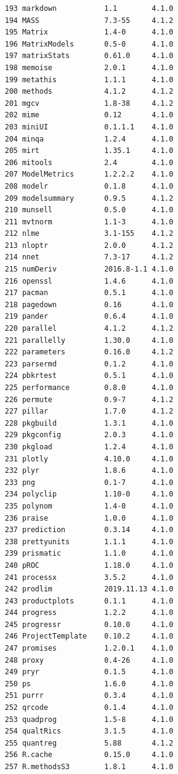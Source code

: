 \documentclass[
  a4paper,
  pandoc,
  ja=standard,
  jafont=haranoaji]{bxjsbook}
\begin{document}
\begin{verbatim}
193 markdown           1.1        4.1.0
194 MASS               7.3-55     4.1.2
195 Matrix             1.4-0      4.1.0
196 MatrixModels       0.5-0      4.1.0
197 matrixStats        0.61.0     4.1.0
198 memoise            2.0.1      4.1.0
199 metathis           1.1.1      4.1.0
200 methods            4.1.2      4.1.2
201 mgcv               1.8-38     4.1.2
202 mime               0.12       4.1.0
203 miniUI             0.1.1.1    4.1.0
204 minqa              1.2.4      4.1.0
205 mirt               1.35.1     4.1.0
206 mitools            2.4        4.1.0
207 ModelMetrics       1.2.2.2    4.1.0
208 modelr             0.1.8      4.1.0
209 modelsummary       0.9.5      4.1.2
210 munsell            0.5.0      4.1.0
211 mvtnorm            1.1-3      4.1.0
212 nlme               3.1-155    4.1.2
213 nloptr             2.0.0      4.1.2
214 nnet               7.3-17     4.1.2
215 numDeriv           2016.8-1.1 4.1.0
216 openssl            1.4.6      4.1.0
217 pacman             0.5.1      4.1.0
218 pagedown           0.16       4.1.0
219 pander             0.6.4      4.1.0
220 parallel           4.1.2      4.1.2
221 parallelly         1.30.0     4.1.0
222 parameters         0.16.0     4.1.2
223 parsermd           0.1.2      4.1.0
224 pbkrtest           0.5.1      4.1.0
225 performance        0.8.0      4.1.0
226 permute            0.9-7      4.1.2
227 pillar             1.7.0      4.1.2
228 pkgbuild           1.3.1      4.1.0
229 pkgconfig          2.0.3      4.1.0
230 pkgload            1.2.4      4.1.0
231 plotly             4.10.0     4.1.0
232 plyr               1.8.6      4.1.0
233 png                0.1-7      4.1.0
234 polyclip           1.10-0     4.1.0
235 polynom            1.4-0      4.1.0
236 praise             1.0.0      4.1.0
237 prediction         0.3.14     4.1.0
238 prettyunits        1.1.1      4.1.0
239 prismatic          1.1.0      4.1.0
240 pROC               1.18.0     4.1.0
241 processx           3.5.2      4.1.0
242 prodlim            2019.11.13 4.1.0
243 productplots       0.1.1      4.1.0
244 progress           1.2.2      4.1.0
245 progressr          0.10.0     4.1.0
246 ProjectTemplate    0.10.2     4.1.0
247 promises           1.2.0.1    4.1.0
248 proxy              0.4-26     4.1.0
249 pryr               0.1.5      4.1.0
250 ps                 1.6.0      4.1.0
251 purrr              0.3.4      4.1.0
252 qrcode             0.1.4      4.1.0
253 quadprog           1.5-8      4.1.0
254 qualtRics          3.1.5      4.1.0
255 quantreg           5.88       4.1.2
256 R.cache            0.15.0     4.1.0
257 R.methodsS3        1.8.1      4.1.0

\end{verbatim}
\end{document}
